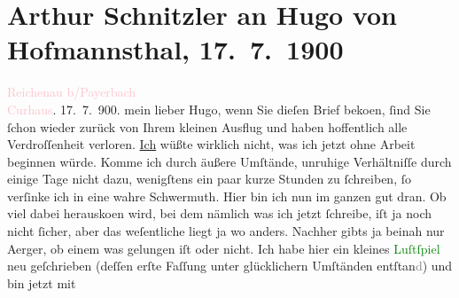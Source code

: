 

               \section[Arthur Schnitzler an Hugo von Hofmannsthal, 17. 7. 1900]{ Arthur Schnitzler an Hugo von Hofmannsthal, 17. 7. 1900}\nopagebreak{}\rehead{ }\normalsize\beginnumbering{} \toendnotes[C]{\smallbreak\pagebreak[2]} 
\toendnotes[C]{\smallbreak}\pstart
           \raggedleft{}{\pb}\textcolor{pink}{Reichenau b/Payerbach{\\}Curhaus}{}\ledrightnote{\textcolor{pink}{Kurhaus Rudolfsbad}}.
                     17. 7. 900. \pend
           \pstart
           mein lieber Hugo, wenn Sie dieſen Brief beko{\geminationm}en, ſind Sie ſchon wieder zurück von Ihrem kleinen
               Ausflug und haben hoffentlich \introOben{}alle\introOben{} Verdroſſenheit verloren.
                  \uline{Ich} wüßte wirklich nicht, was ich jetzt ohne
               Arbeit beginnen würde. Komme ich durch äußere Umſtände, unruhige Verhältniſſe durch
               einige Tage nicht dazu, wenigſtens ein paar kurze Stunden zu ſchreiben, ſo verſinke
               ich in eine wahre Schwermuth. Hier bin ich nun im ganzen {\pb}gut dran. Ob viel dabei herausko{\geminationm}en wird, bei dem
               nämlich was ich jetzt ſchreibe, iſt ja noch nicht ſicher, aber das weſentliche liegt
               ja wo anders. Nachher gibts ja beinah nur Aerger, ob einem was gelungen iſt oder
               nicht. Ich habe hier ein kleines \textcolor{green}{Luſtſpiel}{} neu geſchrieben (deſſen erſte Faſſung \label{K_L01057_1v}\label{K_L01057_1h} unter glücklichern Umſtänden entſtan\textcolor{gray}{d}) und bin jetzt mit
